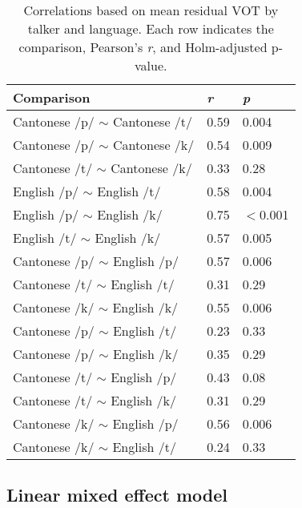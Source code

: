 \begin{table}[hbt]
\caption{Correlations based on mean residual VOT by talker and language. Each row indicates the comparison, Pearson's \textit{r}, and Holm-adjusted p-value.}
  \label{tab:correlations}
  \centering
  \begin{tabular}{lll}
    \toprule
\textbf{Comparison}			& \textbf{\textit{r}}	& \textbf{\textit{p}} \\
\midrule
Cantonese /p/ $\sim$ Cantonese /t/   &	0.59	&	0.004 \\
Cantonese /p/ $\sim$ Cantonese /k/   &	0.54	&	0.009 \\
Cantonese /t/ $\sim$ Cantonese /k/   &	0.33	&	0.28 \\
English /p/ $\sim$ English /t/	     &	0.58	&	0.004 \\
English /p/ $\sim$ English /k/	     &	0.75 	&	$<$0.001 \\
English /t/ $\sim$ English /k/	     &	0.57	&	0.005 \\
Cantonese /p/ $\sim$ English /p/	 &	0.57	&	0.006 \\
Cantonese /t/ $\sim$ English /t/	 &	0.31	&	0.29 \\
Cantonese /k/ $\sim$ English /k/	 &	0.55	&	0.006 \\
Cantonese /p/ $\sim$ English /t/	 &	0.23	&	0.33 \\
Cantonese /p/ $\sim$ English /k/	 &	0.35	&	0.29 \\
Cantonese /t/ $\sim$ English /p/	 &	0.43	&	0.08 \\
Cantonese /t/ $\sim$ English /k/	 &	0.31	&	0.29 \\
Cantonese /k/ $\sim$ English /p/	 &	0.56	&	0.006 \\
Cantonese /k/ $\sim$ English /t/	 &	0.24	&	0.33 \\
    \bottomrule
  \end{tabular}
\end{table}

\subsection{Linear mixed effect model}


